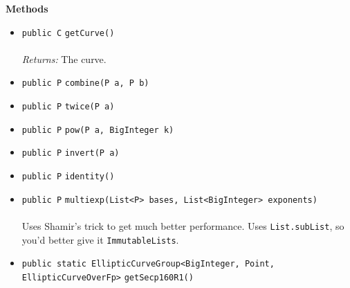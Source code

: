 \textbf{\sffamily Methods}
\begin{itemize}
\item \lstinline|public C| \lstinline|getCurve|\lstinline|()|\\ \\[-0.6em]
\emph{Returns:} The curve.



\item \lstinline|public P| \lstinline|combine|\lstinline|(P a, P b)| \\[-0.6em]




\item \lstinline|public P| \lstinline|twice|\lstinline|(P a)| \\[-0.6em]




\item \lstinline|public P| \lstinline|pow|\lstinline|(P a, BigInteger k)| \\[-0.6em]




\item \lstinline|public P| \lstinline|invert|\lstinline|(P a)| \\[-0.6em]




\item \lstinline|public P| \lstinline|identity|\lstinline|()| \\[-0.6em]




\item \lstinline|public P| \lstinline|multiexp|\lstinline|(List<P> bases, List<BigInteger> exponents)|\\ \\[-0.6em]
Uses Shamir's trick to get much better performance. Uses \lstinline|List.subList|, so you'd
 better give it \lstinline|ImmutableLists|.



\item \lstinline|public static EllipticCurveGroup<BigInteger, Point, EllipticCurveOverFp>| \lstinline|getSecp160R1|\lstinline|()| \\[-0.6em]




\end{itemize}

